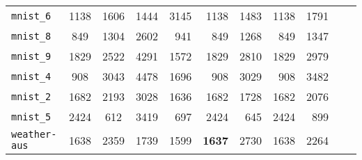 \begin{tabular}{lccrrrrrrrr}
\texttt{mnist\_6} & 1138 & 1606 & 1444 & 3145 & 1138 & 1483 & 1138 & 1791\\
\texttt{mnist\_8} & 849 & 1304 & 2602 & 941 & 849 & 1268 & 849 & 1347\\
\texttt{mnist\_9} & 1829 & 2522 & 4291 & 1572 & 1829 & 2810 & 1829 & 2979\\
\texttt{mnist\_4} & 908 & 3043 & 4478 & 1696 & 908 & 3029 & 908 & 3482\\
\texttt{mnist\_2} & 1682 & 2193 & 3028 & 1636 & 1682 & 1728 & 1682 & 2076\\
\texttt{mnist\_5} & 2424 & 612 & 3419 & 697 & 2424 & 645 & 2424 & 899\\
\texttt{weather-aus} & 1638 & 2359 & 1739 & 1599 & \textbf{1637} & 2730 & 1638 & 2264\\
\bottomrule
\end{tabular}
